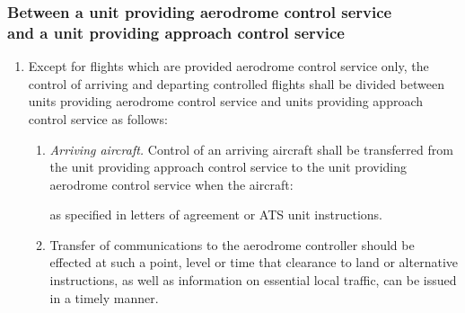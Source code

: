 \subsubsection[Between a unit providing aerodrome control service and a unit providing approach control service]{Between a unit providing aerodrome control service \\ and a unit providing approach control service}

\begin{enumerate}
    \item Except for flights which are provided aerodrome control service only, the control of arriving and departing controlled flights shall be divided between units providing aerodrome control service and units providing approach control service as follows:
    
    \begin{enumerate}
        \item \textit{Arriving aircraft.} Control of an arriving aircraft shall be transferred from the unit providing approach control service to the unit providing aerodrome control service when the aircraft:
        
        
        \noindent as specified in letters of agreement or ATS unit instructions.
        
        \item \label{4.3.2.1.2} Transfer of communications to the aerodrome controller should be effected at such a point, level or time that clearance to land or alternative instructions, as well as information on essential local traffic, can be issued in a timely manner.
        

\end{enumerate}
\end{enumerate}
